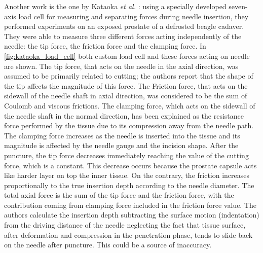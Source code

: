 Another work is the one by Kataoka \textit{et al.} \cite{Kataoka2002}: using a specially developed seven-axis load cell for measuring and separating forces during needle insertion, they performed experiments on an exposed prostate of a defrosted beagle cadaver.
They were able to measure three different forces acting independently  of the needle: the tip force, the friction force and the clamping force.
In \figurename{ \ref{fig:kataoka_load_cell}} both custom load cell and these forces acting on needle  are shown.
The tip force, that acts on the needle in the axial direction, was assumed to be primarily related to cutting; the authors report that the shape of the tip affects the magnitude of this force.
The Friction force, that acts on the sidewall of the needle shaft in axial direction, was considered to be the sum of Coulomb and viscous frictions.
The clamping force, which acts on the sidewall of the needle shaft in the normal direction, has been explained as the resistance force performed by the tissue due to its compression away from the needle path.
The clamping force increases as the needle is inserted into the tissue and its magnitude is affected by the needle gauge and the incision shape.
After the puncture, the tip force decreases immediately reaching the value of the cutting force, which is a constant.
This decrease occurs because the prostate capsule acts like harder layer on top the inner tissue.
On the contrary, the friction increases proportionally to the true insertion depth according to the needle diameter.
The total axial force is the sum of the tip force and the friction force, with the contribution coming from clamping force included in the friction force value.
The authors calculate the insertion depth subtracting the surface motion (indentation) from the driving distance of the needle neglecting the fact that tissue surface, after deformation and compression in the penetration phase, tends to slide back on the needle after puncture. This could be a source of inaccuracy.

